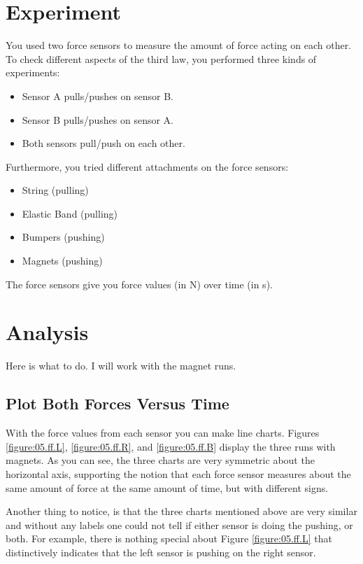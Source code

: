 \section{Experiment}
You used two force sensors to measure the amount of force acting on each other. To check different aspects of the third law, you performed three kinds of experiments:
\begin{itemize}
    \item Sensor A pulls/pushes on sensor B.
    \item Sensor B pulls/pushes on sensor A.
    \item Both sensors pull/push on each other.
\end{itemize}
Furthermore, you tried different attachments on the force sensors:
\begin{itemize}
    \item String (pulling)
    \item Elastic Band (pulling)
    \item Bumpers (pushing)
    \item Magnets (pushing)
\end{itemize}
The force sensors give you force values (in N) over time (in s).
\section{Analysis}
Here is what to do. I will work with the magnet runs.
\subsection{Plot Both Forces Versus Time}
With the force values from each sensor you can make line charts. Figures \ref{figure:05.ff.L}, \ref{figure:05.ff.R}, and \ref{figure:05.ff.B} display the three runs with magnets. As you can see, the three charts are very symmetric about the horizontal axis, supporting the notion that each force sensor measures about the same amount of force at the same amount of time, but with different signs.

Another thing to notice, is that the three charts mentioned above are very similar and without any labels one could not tell if either sensor is doing the pushing, or both. For example, there is nothing special about Figure \ref{figure:05.ff.L} that distinctively indicates that the left sensor is pushing on the right sensor.
